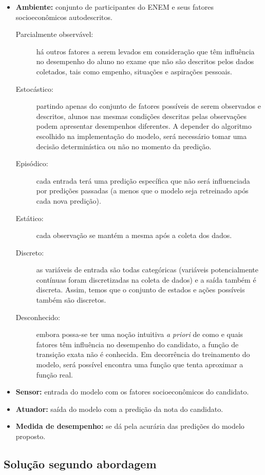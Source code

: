 \documentclass[letterpaper]{article} %
\begin{document}
\begin{itemize}
\item \textbf{Ambiente:} conjunto de participantes do ENEM e seus fatores socioeconômicos autodescritos.
\begin{description}
\item[Parcialmente observável:] há outros fatores a serem levados em consideração que têm influência no desempenho do aluno no exame que não são descritos pelos dados coletados, tais como empenho, situações e aspirações pessoais.
\item[Estocástico:] partindo apenas do conjunto de fatores possíveis de serem observados e descritos, alunos nas mesmas condições descritas pelas observações podem apresentar desempenhos diferentes. A depender do algoritmo escolhido na implementação do modelo, será necessário tomar uma decisão determinística ou não no momento da predição.
\item[Episódico:] cada entrada terá uma predição específica que não será influenciada por predições passadas (a menos que o modelo seja retreinado após cada nova predição).
\item[Estático:] cada observação se mantém a mesma após a coleta dos dados.
\item[Discreto:] as variáveis de entrada são todas categóricas (variáveis potencialmente contínuas foram discretizadas na coleta de dados) e a saída também é discreta. Assim, temos que o conjunto de estados e ações possíveis também são discretos.
\item[Desconhecido:] embora possa-se ter uma noção intuitiva \textit{a priori} de como e quais fatores têm influência no desempenho do candidato, a função de transição exata não é conhecida. Em decorrência do treinamento do modelo, será possível encontra uma função que tenta aproximar a função real.
\end{description}
\item \textbf{Sensor:} entrada do modelo com os fatores socioeconômicos do candidato.
\item \textbf{Atuador:} saída do modelo com a predição da nota do candidato.
\item \textbf{Medida de desempenho:} se dá pela acurária das predições do modelo proposto.
\end{itemize}


\subsection{Solução segundo abordagem}
\end{document}
